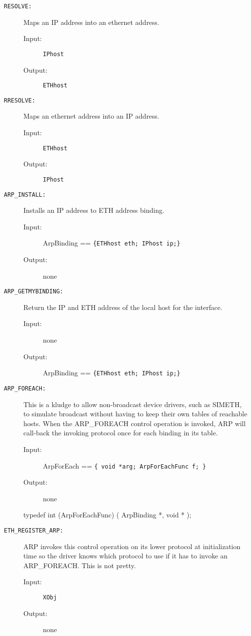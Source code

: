 \begin{description}

\item[{\tt RESOLVE:}]
Maps an IP address into an ethernet address.
\begin{description}
\item[{\rm Input:}] {\tt IPhost }
\item[{\rm Output:}] {\tt ETHhost}
\end{description}

\item[{\tt RRESOLVE:}]
Maps an ethernet address into an IP address.
\begin{description}
\item[{\rm Input:}] {\tt ETHhost}
\item[{\rm Output:}] {\tt IPhost}
\end{description}

\item[{\tt ARP\_INSTALL:}]
Installs an IP address to ETH address binding.
\begin{description}
\item[{\rm Input:}] { ArpBinding == \tt \{ETHhost eth; IPhost ip;\} }
\item[{\rm Output:}] none
\end{description}

\item[{\tt ARP\_GETMYBINDING:}]
Return the IP and ETH address of the local host for the interface.
\begin{description}
\item[{\rm Input:}] none
\item[{\rm Output:}] { ArpBinding == \tt \{ETHhost eth; IPhost ip;\} }
\end{description}

\item[{\tt ARP\_FOREACH:}]
This is a kludge to allow non-broadcast device drivers, such as
SIMETH, to simulate broadcast without having to keep their own tables
of reachable hosts.  When the ARP\_FOREACH control operation is
invoked, ARP will call-back the invoking protocol once for each
binding in its table.  
\begin{description}
\item[{\rm Input:}] { ArpForEach == \tt \{ void *arg; ArpForEachFunc f; \} }
\item[{\rm Output:}] none
\end{description}

{\sem typedef int}	({\bold ArpForEachFunc})
( 
{\sem ArpBinding} *, 
{\sem void} * 
);


\item[{\tt ETH\_REGISTER\_ARP:}]
ARP invokes this control operation on its lower protocol at
initialization time so the driver knows which protocol to use if it
has to invoke an ARP\_FOREACH.  This is not pretty.
\begin{description}
\item[{\rm Input:}] { \tt XObj }
\item[{\rm Output:}] none
\end{description}



\end{description}

